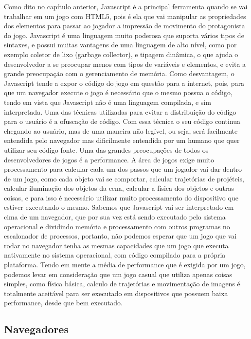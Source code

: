 Como dito no capítulo anterior, Javascript é a principal ferramenta
quando se vai trabalhar em um jogo com HTML5, pois é ela que vai
manipular as propriedades dos elementos para passar ao jogador a
impressão de movimento do protagonista do jogo.
Javascript é uma linguagem muito poderosa que suporta vários tipos de
sintaxes, e possui muitas vantagens de uma linguagem de alto nível,
como por exemplo coletor de lixo (garbage collector), e tipagem
dinâmica, o que ajuda o desenvolvedor a se preocupar menos com tipos
de variáveis e elementos, e evita a grande preocupação com o
gerenciamento de memória.
Como desvantagem, o Javascript tende a expor o código do jogo em
questão para a internet, pois, para que um navegador execute o jogo é
necessário que o mesmo possua o código, tendo em vista que Javascript
não é uma linguagem compilada, e sim interpretada. Uma das técnicas
utilizadas para evitar a distribuição do código para o usuário é a
ofuscação de código. Com essa técnica o seu código continua chegando
ao usuário, mas de uma maneira não legível, ou seja, será facilmente
entendida pelo navegador mas dificilmente entendida por um humano que
quer utilizar seu código fonte.
Uma das grandes preocupações de todos os desenvolvedores de jogos é a
performance. A área de jogos exige muito processamento para calcular
cada um dos passos que um jogador vai dar dentro de um jogo, como cada
objeto vai se comportar, calcular trajetórias de projéteis, calcular
iluminação dos objetos da cena, calcular a física dos objetos e outras
coisas, e para isso é necessário utilizar muito processamento do
dispositivo que estiver executando o mesmo. Sabemos que Javascript vai
ser interpretado em cima de um navegador, que por sua vez está sendo
executado pelo sistema operacional e dividindo memória e processamento
com outros programas no escalonador de processos, portanto, não
podemos esperar que um jogo que vai rodar no navegador tenha as mesmas
capacidades que um jogo que executa nativamente no sistema
operacional, com código compilado para a própria plataforma.
Tendo em mente a média de performance que é exigida por um jogo,
podemos levar em consideração que um jogo casual que utiliza apenas
coisas simples, como física básica, calculo de trajetórias e
movimentação de imagens é totalmente aceitável para ser executado em
dispositivos que possuem baixa performance, desde que bem executado.

\subsection{Navegadores}

